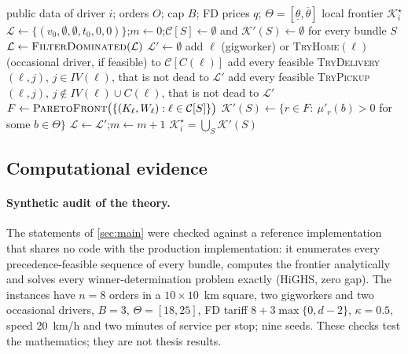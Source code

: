 \documentclass[11pt]{article}
\theoremstyle{definition}
\theoremstyle{remark}
\newcommand{\Ks}{\mathcal{K}^{\star}}
\newcommand{\thl}{\underline{\theta}}
\newcommand{\thu}{\overline{\theta}}
\begin{document}
\begin{algorithm}[!htbp]
\caption{\textsc{GenerateRoutes}$(i)$: Algorithm A for one driver (final version: event tiers, dead-end filter, frontier inside the loop)}
\label{alg:routegen}
\begin{algorithmic}[1]
\Require public data of driver $i$; orders $O$; cap $B$; FD prices $q$; $\Theta=[\thl,\thu]$
\Ensure local frontier $\Ks_i$
\State $\mathcal L\gets\{(v_0,\emptyset,\emptyset,t_0,0,0)\}$;\quad $m\gets0$;\quad $\mathcal C[S]\gets\emptyset$ and $\mathcal K'(S)\gets\emptyset$ for every bundle $S$
 
  \State $\mathcal L\gets\textsc{FilterDominated}(\mathcal L)$ 
  \State $\mathcal L'\gets\emptyset$
      \State add $\ell$ (gigworker) or \textsc{TryHome}$(\ell)$ (occasional driver, if feasible) to $\mathcal C[C(\ell)]$
    \EndIf
    \State add every feasible \textsc{TryDelivery}$(\ell,j)$, $j\in IV(\ell)$, that is not dead to $\mathcal L'$ 
      \State add every feasible \textsc{TryPickup}$(\ell,j)$, $j\notin IV(\ell)\cup C(\ell)$, that is not dead to $\mathcal L'$
    \EndIf
  \EndFor
   
      \State $F\gets\textsc{ParetoFront}\bigl(\{(K_\ell,W_\ell):\ell\in\mathcal C[S]\}\bigr)$ 
      \State $\mathcal K'(S)\gets\{r\in F:\ \mu'_r(b)>0$ for some $b\in\Theta\}$ 
    \EndFor
  \EndIf
  \State $\mathcal L\gets\mathcal L'$;\quad $m\gets m+1$
\EndWhile
\State \Return $\Ks_i=\bigcup_S\mathcal K'(S)$
\end{algorithmic}
\end{algorithm}


\subsection{Computational evidence}
\label{sec:evidence}

\paragraph{Synthetic audit of the theory.} The statements of \cref{sec:main}
were checked against a reference implementation that shares no code with the
production implementation: it enumerates every precedence-feasible sequence of
every bundle, computes the frontier analytically and solves every
winner-determination problem exactly (HiGHS, zero gap). The instances have $n=8$
orders in a $10\times10$~km square, two gigworkers and two occasional drivers,
$B=3$, $\Theta=[18,25]$, FD tariff $8+3\max\{0,d-2\}$, $\kappa=0.5$, speed
20~km/h and two minutes of service per stop; nine seeds. These checks test the
mathematics; they are not thesis results.
\end{document}
